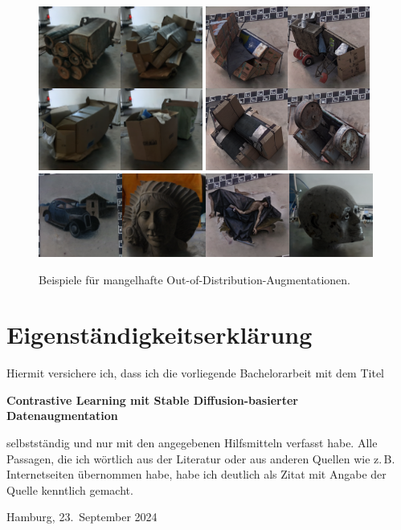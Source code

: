 \begin{figure}[h]
  \centering
  \includegraphics[width=0.48\textwidth]{images/figure_results_ood-augs_bad_1.png}%
  \hspace{0.02\textwidth}\includegraphics[width=0.48\textwidth]{images/figure_results_ood-augs_bad_2.png}\vspace{0.01\textwidth}
  \includegraphics[width=0.98\textwidth]{figure_results_ood-augs_bad_4.png}
  \caption{Beispiele für mangelhafte Out-of-Distribution-Augmentationen.}
  \label{fig:ood-augs-bad}
\end{figure}

\clearpage

\thispagestyle{empty}
\section*{Eigenständigkeitserklärung}

Hiermit versichere ich, dass ich die vorliegende Bachelorarbeit mit dem Titel
\begin{center}
  \textbf{Contrastive Learning mit Stable Diffusion-basierter Datenaugmentation}
\end{center}
selbstständig und nur mit den angegebenen Hilfsmitteln verfasst habe.  Alle
Passagen, die ich wörtlich aus der Literatur oder aus anderen Quellen wie
z.\,B. Internetseiten übernommen habe, habe ich deutlich als Zitat mit Angabe
der Quelle kenntlich gemacht.

\vspace{2cm}

Hamburg, 23.\ September 2024
